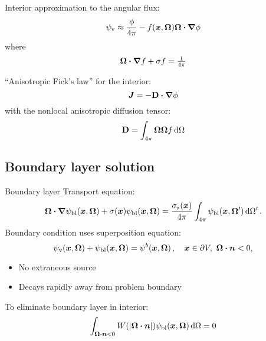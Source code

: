 \documentclass{beamer}
\newcommand{\psiv}{\psi_\mathrm{v}}
\newcommand{\psibl}{\psi_\mathrm{bl}}
\begin{document}
\begin{frame}
  Interior approximation to the angular flux:
  \begin{equation*}
    \psiv \approx \frac{\phi}{4\pi} - f(\vec{x},\vec{\Omega}) \vec{\Omega}\vd
    \grad \phi
  \end{equation*}
  where
  \begin{equation*}
    \bm{\Omega}\bm{\cdot} \bm{\nabla} f + \sigma f = \tfrac{1}{4\pi}
  \end{equation*}

  ``Anisotropic Fick's law'' for the interior:
  \begin{equation*}
    \bm{J} = - \mathbf{D} \bm{\cdot} \bm{\nabla} \phi
  \end{equation*}
  with the nonlocal anisotropic diffusion tensor:
  \begin{equation*}
    \mathbf{D} = \int_{4\pi} \bm{\Omega} \bm{\Omega} f \mathop{}\!\mathrm{d}\Omega
  \end{equation*}
\end{frame}

\subsection{Boundary layer solution}
\begin{frame}{Boundary layer}
Transport equation:
\begin{equation*}
  \vec{\Omega}\vd \grad \psibl(\vec{x},\vec{\Omega})
  + \sigma(\vec{x}) \psibl(\vec{x},\vec{\Omega})
  = \frac{\sigma_s(\vec{x})}{4\pi}
  \int_{4\pi} \psibl(\vec{x},\vec{\Omega}') \ud \Omega' \,.
\end{equation*}
Boundary condition uses superposition equation:
\begin{equation*}
\psiv(\vec{x},\vec{\Omega})
+ \psibl(\vec{x},\vec{\Omega})
 = \psi^b(\vec{x},\vec{\Omega}) \,,
  \quad \vec{x}\in \partial V ,\ \vec{\Omega}\vd \vec{n} < 0,
\end{equation*}

  \begin{itemize}
    \item No extraneous source
    \item Decays rapidly away from problem boundary
  \end{itemize}

  To eliminate boundary layer in interior:
  \begin{equation*}
    \int_{\vec{\Omega}\vd \vec{n} < 0} W(\abs{\vec{\Omega}\vd
    \vec{n}}) \psibl(\vec{x},\vec{\Omega}) \ud \Omega = 0
  \end{equation*}
\end{frame}
\end{document}
